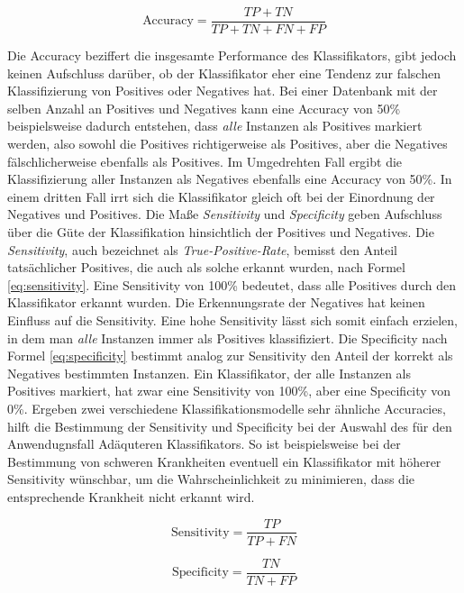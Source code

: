 \begin{equation}
\text{Accuracy} = \frac{TP+TN}{TP+TN+FN+FP}
\label{eq:accuracy}
\end{equation}

Die Accuracy beziffert die insgesamte Performance des Klassifikators, gibt jedoch keinen Aufschluss darüber, ob der Klassifikator eher eine Tendenz zur falschen Klassifizierung von Positives oder Negatives hat. Bei einer Datenbank mit der selben Anzahl an Positives und Negatives kann eine Accuracy von 50\% beispielsweise dadurch entstehen, dass \emph{alle} Instanzen als Positives markiert werden, also sowohl die Positives richtigerweise als Positives, aber die Negatives fälschlicherweise ebenfalls als Positives. Im Umgedrehten Fall ergibt die Klassifizierung aller Instanzen als Negatives ebenfalls eine Accuracy von 50\%. In einem dritten Fall irrt sich die Klassifikator gleich oft bei der Einordnung der Negatives und Positives. Die Maße \emph{Sensitivity} und \emph{Specificity} geben Aufschluss über die Güte der Klassifikation hinsichtlich der Positives und Negatives. Die \emph{Sensitivity}, auch bezeichnet als \emph{True-Positive-Rate}, bemisst den Anteil tatsächlicher Positives, die auch als solche erkannt wurden, nach Formel \ref{eq:sensitivity}. Eine Sensitivity von 100\% bedeutet, dass alle Positives durch den Klassifikator erkannt wurden. Die Erkennungsrate der Negatives hat keinen Einfluss auf die Sensitivity. Eine hohe Sensitivity lässt sich somit \glqq einfach\grqq{} erzielen, in dem man \emph{alle} Instanzen immer als Positives klassifiziert. Die Specificity nach Formel \ref{eq:specificity} bestimmt analog zur Sensitivity den Anteil der korrekt als Negatives bestimmten Instanzen. Ein Klassifikator, der alle Instanzen als Positives markiert, hat zwar eine Sensitivity von 100\%, aber eine Specificity von 0\%. Ergeben zwei verschiedene Klassifikationsmodelle sehr ähnliche Accuracies, hilft die Bestimmung der Sensitivity und Specificity bei der Auswahl des für den Anwendugnsfall Adäquteren Klassifikators. So ist beispielsweise bei der Bestimmung von schweren Krankheiten eventuell ein Klassifikator mit höherer Sensitivity wünschbar, um die Wahrscheinlichkeit zu minimieren, dass die entsprechende Krankheit nicht erkannt wird. \cite{sens-and_spec}  \cite[S. 222]{machine_kubat}

\begin{equation}
\text{Sensitivity} = \frac{TP}{TP+FN}
\label{eq:sensitivity}
\end{equation}

\begin{equation}
\text{Specificity} = \frac{TN}{TN+FP}
\label{eq:specificity}
\end{equation}

